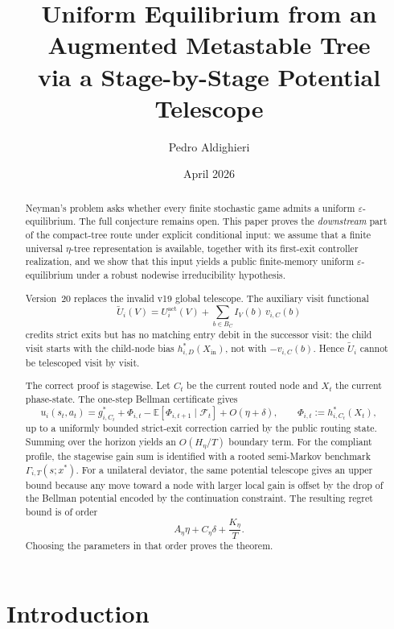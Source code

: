 \documentclass[12pt]{article}
\title{\textbf{Uniform Equilibrium from an Augmented Metastable Tree\\via a Stage-by-Stage Potential Telescope}}
\author{Pedro Aldighieri}
\date{April 2026}
\theoremstyle{definition}
\newcommand{\eps}{\varepsilon}
\newcommand{\E}{\mathbb{E}}
\newcommand{\1}{\mathbf{1}}
\newcommand{\cF}{\mathcal{F}}
\begin{document}
\maketitle





\begin{abstract}
Neyman's problem asks whether every finite stochastic game admits a uniform
$\eps$-equilibrium. The full conjecture remains open. This paper proves the
\emph{downstream} part of the compact-tree route under explicit conditional input:
we assume that a finite universal $\eta$-tree representation is available,
together with its first-exit controller realization, and we show that this input
yields a public finite-memory uniform $\eps$-equilibrium under a robust
nodewise irreducibility hypothesis.

Version~20 replaces the invalid v19 global telescope. The auxiliary visit
functional
\[
\widetilde U_i(V)
=
U_i^{\mathrm{act}}(V)
+
\sum_{b\in B_C}I_V(b)\,v_{i,C}(b)
\]
credits strict exits but has no matching entry debit in the successor visit:
the child visit starts with the child-node bias
$h_{i,D}^*(X_{\mathrm{in}})$, not with $-v_{i,C}(b)$. Hence
$\widetilde U_i$ cannot be telescoped visit by visit.

The correct proof is stagewise. Let $C_t$ be the current routed node and $X_t$
the current phase-state. The one-step Bellman certificate gives
\[
u_i(s_t,a_t)
=
g_{i,C_t}^*
+
\Phi_{i,t}
-
\E[\Phi_{i,t+1}\mid \cF_t]
+
O(\eta+\delta),
\qquad
\Phi_{i,t}:=h_{i,C_t}^*(X_t),
\]
up to a uniformly bounded strict-exit correction carried by the public routing
state. Summing over the horizon yields an $O(H_\eta/T)$ boundary term. For the
compliant profile, the stagewise gain sum is identified with a rooted
semi-Markov benchmark $\Gamma_{i,T}(s;x^*)$. For a unilateral deviator, the same
potential telescope gives an upper bound because any move toward a node with
larger local gain is offset by the drop of the Bellman potential encoded by the
continuation constraint. The resulting regret bound is of order
\[
A_\eta\eta + C_\eta\delta + \frac{K_\eta}{T}.
\]
Choosing the parameters in that order proves the theorem.
\end{abstract}






\tableofcontents

\section{Introduction}
\end{document}
